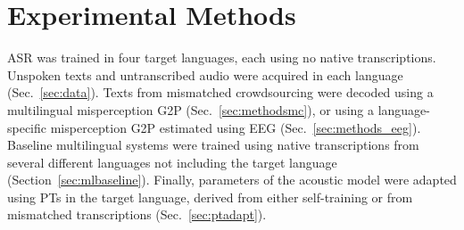 \section{Experimental Methods}
\label{sec:methods}

ASR was trained in four target languages, each using no native
transcriptions.  Unspoken texts and untranscribed audio were acquired
in each language (Sec.~\ref{sec:data}).  Texts from mismatched
crowdsourcing were decoded using a multilingual misperception G2P
(Sec.~\ref{sec:methodsmc}), or using a language-specific misperception
G2P estimated using EEG (Sec.~\ref{sec:methods_eeg}).  Baseline
multilingual systems were trained using native transcriptions from
several different languages not including the target language
(Section~\ref{sec:mlbaseline}).  Finally, parameters of the acoustic
model were adapted using PTs in the target language, derived from
either self-training or from mismatched transcriptions
(Sec.~\ref{sec:ptadapt}).

